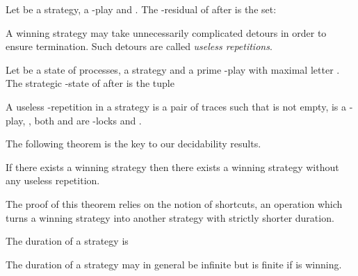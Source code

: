 \documentclass[a4paper,UKenglish]{lipics-v2016}
\begin{document}
\begin{definition}[Residual]
Let  be a strategy,
 a -play and .
The -residual of  after  is
the set:

\end{definition}

A winning strategy may take unnecessarily complicated detours in order to ensure termination.
Such detours are called \emph{useless repetitions}.
\begin{definition}
Let  be a state of processes,
 a strategy and  a prime -play with maximal letter .
The strategic -state of  after  is the tuple


\end{definition}






\begin{definition}
A useless -repetition in a strategy 
is a pair of traces  such that  is not empty,
 is a -play,  ,
both  and  are -locks and .
\end{definition}

The following theorem is the key to our decidability results.

\begin{theorem}
If there exists a winning strategy
then there exists a winning strategy 
without any useless repetition.
\label{theo:uselessdistrib}
\end{theorem}

The proof of this theorem relies on the notion of shortcuts,
an operation which turns a winning strategy into another strategy with strictly shorter duration.

\begin{definition}
The duration of a strategy  is 

\end{definition}

The duration of a  strategy  may in general be infinite but is finite if  is winning.
\end{document}
